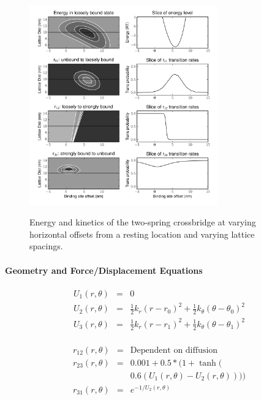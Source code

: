 \documentclass[11pt]{article}
\begin{document}
\begin{multicols}{2}
\begin{figure}[H]
    \begin{center}
    \includegraphics[width=3.2in]{../imgs/xxCG_hybrid.pdf}
    \label{fig:xxCG}
    \caption{{\small 
        Energy and kinetics of the two-spring crossbridge at varying horizontal offsets from a resting location and varying lattice spacings.}}
    \end{center}
\end{figure}

\paragraph*{Geometry and Force/Displacement Equations}

\begin{eqnarray}
\label{2sEnergy}
	U_1(r,\theta) & = & 0 \nonumber \\
    U_2(r,\theta) & = & \frac{1}{2}k_r (r - r_0)^2 + 
                        \frac{1}{2}k_\theta (\theta - \theta_0)^2 \nonumber \\
    U_3(r,\theta) & = & \frac{1}{2}k_r (r - r_1)^2 + 
                        \frac{1}{2}k_\theta (\theta - \theta_1)^2 \\
\end{eqnarray}

\begin{eqnarray}  
\label{2sTransRates}
	r_{12}(r, \theta)   & = & \text{Dependent on diffusion} \nonumber \\
    r_{23}(r, \theta)   & = & 0.001 + 0.5 * (1 + \tanh( \nonumber \\
                        &   & 0.6 (U_1(r, \theta) - U_2(r, \theta)))) \\
	r_{31}(r, \theta)   & = & e^{-1 / U_2(r, \theta)}
\end{eqnarray} 


\end{multicols}
\end{document}
